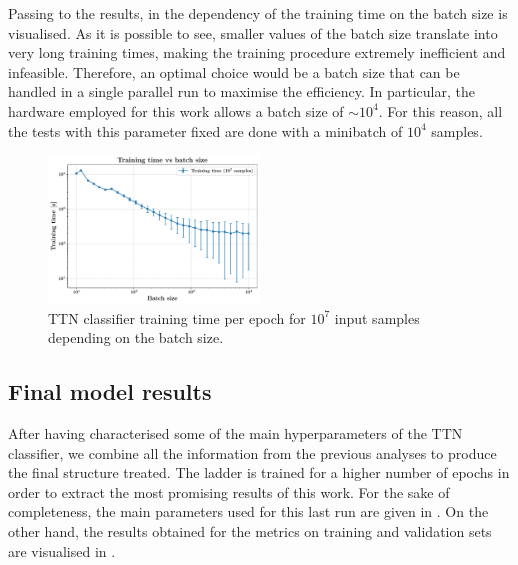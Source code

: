 \documentclass[../main/main.tex]{subfiles}
\begin{document}
Passing to the results, in  the dependency of the training time on the batch size is visualised. As it is possible to see, smaller values of the batch size translate into very long training times, making the training procedure extremely inefficient and infeasible. Therefore, an optimal choice would be a batch size that can be handled in a single parallel run to maximise the efficiency. In particular, the hardware employed for this work allows a batch size of \( \sim 10^{4} \). For this reason, all the tests with this parameter fixed are done with a minibatch of \( 10^{4} \) samples.

\begin{figure}[!h]
    \centering
    \includegraphics[width=0.5\textwidth]{images/results/characterisation/results_characterisation_batch.pdf}
    \caption{TTN classifier training time per epoch for \( 10^{7} \) input samples depending on the batch size.}
    \label{fig:results_characterisation_batch}
\end{figure}



\subsection{Final model results}
\label{ssec:results_final}

After having characterised some of the main hyperparameters of the TTN classifier, we combine all the information from the previous analyses to produce the final structure treated. The ladder is trained for a higher number of epochs in order to extract the most promising results of this work. For the sake of completeness, the main parameters used for this last run are given in . On the other hand, the results obtained for the metrics on training and validation sets are visualised in .
\end{document}
